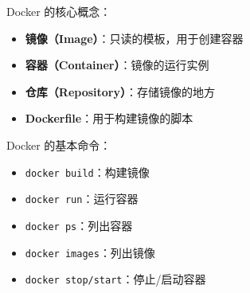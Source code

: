 Docker 的核心概念：
\begin{itemize}
  \item \textbf{镜像（Image）}：只读的模板，用于创建容器
  \item \textbf{容器（Container）}：镜像的运行实例
  \item \textbf{仓库（Repository）}：存储镜像的地方
  \item \textbf{Dockerfile}：用于构建镜像的脚本
\end{itemize}

Docker 的基本命令：
\begin{itemize}
  \item \texttt{docker build}：构建镜像
  \item \texttt{docker run}：运行容器
  \item \texttt{docker ps}：列出容器
  \item \texttt{docker images}：列出镜像
  \item \texttt{docker stop/start}：停止/启动容器
\end{itemize}
